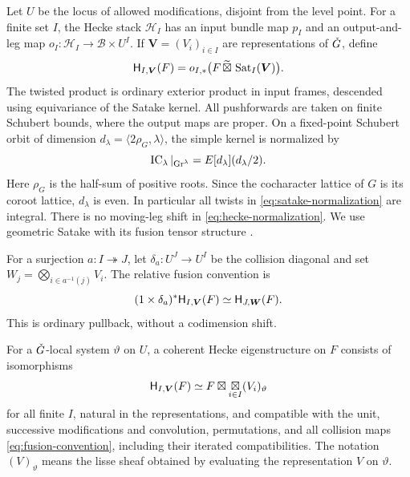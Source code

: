 Let $U$ be the locus of allowed modifications, disjoint from the level
point. For a finite set $I$, the Hecke stack $\mathcal H_I$ has an input
bundle map $p_I$ and an output-and-leg map
$o_I:\mathcal H_I\to\mathcal B\times U^I$.
If $\boldsymbol V=(V_i)_{i\in I}$ are representations of $\check G$, define
\begin{equation}\label{eq:hecke-normalization}
 \mathsf H_{I,\boldsymbol V}(F)
  =o_{I,*}\bigl(F\,\widetilde\boxtimes\,
                      \operatorname{Sat}_I(\boldsymbol V)\bigr).
\end{equation}
The twisted product is ordinary exterior product in input frames, descended
using equivariance of the Satake kernel. All pushforwards are taken on
finite Schubert bounds, where the output maps are proper. On a fixed-point
Schubert orbit of dimension $d_\lambda=\langle2\rho_G,\lambda\rangle$,
the simple kernel is normalized by
\begin{equation}\label{eq:satake-normalization}
 \operatorname{IC}_\lambda|_{\operatorname{Gr}^\lambda}=E[d_\lambda](d_\lambda/2).
\end{equation}
Here $\rho_G$ is the half-sum of positive roots. Since the cocharacter
lattice of $G$ is its coroot lattice, $d_\lambda$ is even. In particular
all twists in \eqref{eq:satake-normalization} are integral.
There is no moving-leg shift in \eqref{eq:hecke-normalization}.
We use geometric Satake with its fusion tensor structure \cite{MV}.

For a surjection $a:I\twoheadrightarrow J$, let
$\delta_a:U^J\to U^I$ be the collision diagonal and set
$W_j=\bigotimes_{i\in a^{-1}(j)}V_i$. The relative fusion convention is
\begin{equation}\label{eq:fusion-convention}
 (1\times\delta_a)^*\mathsf H_{I,\boldsymbol V}(F)
   \simeq\mathsf H_{J,\boldsymbol W}(F).
\end{equation}
This is ordinary pullback, without a codimension shift.

\begin{definition}\label{def:eigenstructure}
For a $\check G$-local system $\vartheta$ on $U$, a coherent Hecke
eigenstructure on $F$ consists of isomorphisms
\begin{equation}\label{eq:eigenstructure}
 \mathsf H_{I,\boldsymbol V}(F)
   \simeq F\boxtimes\mathop{\boxtimes}_{i\in I}(V_i)_\vartheta
\end{equation}
for all finite $I$, natural in the representations, and compatible with
the unit, successive modifications and convolution, permutations, and
all collision maps \eqref{eq:fusion-convention}, including their iterated
compatibilities. The notation $(V)_\vartheta$ means the lisse sheaf
obtained by evaluating the representation $V$ on $\vartheta$.
\end{definition}

